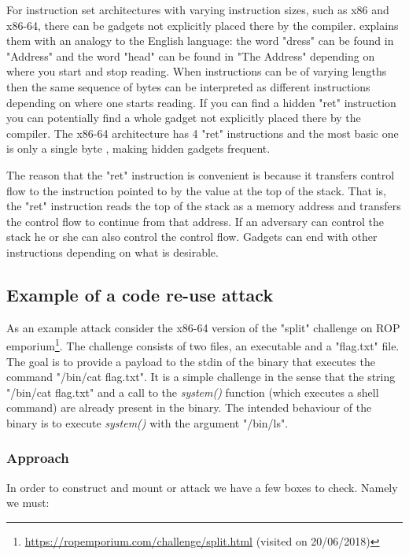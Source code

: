 For instruction set architectures with varying instruction sizes, such as x86 and x86-64,
there can be gadgets not explicitly placed there by the compiler. \textcite{rop} explains
them with an analogy to the English language: the word "dress" can be found in
"Address" and the word "head" can be found in "The Address" depending on where you start
and stop reading. When instructions can be of varying lengths then the same sequence of
bytes can be interpreted as different instructions depending on where one starts reading.
If you can find a hidden "ret" instruction you can potentially find a whole gadget not
explicitly placed there by the compiler. The x86-64 architecture has 4 "ret" instructions
and the most basic one is only a single byte \cite{x86-ret}, making hidden gadgets frequent.

The reason that the "ret" instruction is convenient is because it transfers control flow
to the instruction pointed to by the value at the top of the stack. That is, the "ret"
instruction reads the top of the stack as a memory address and transfers the control flow
to continue from that address. If an adversary can control the stack he or she can also
control the control flow. Gadgets can end with other instructions depending on what is
desirable.

\subsection{Example of a code re-use attack}

As an example attack consider the x86-64 version of the "split" challenge on ROP emporium\footnote{\url{https://ropemporium.com/challenge/split.html} (visited on 20/06/2018)}.
The challenge consists of two files, an executable and a "flag.txt" file. The goal is to
provide a payload to the stdin of the binary that executes the command "/bin/cat flag.txt".
It is a simple challenge in the sense that the string "/bin/cat flag.txt" and a call to
the \textit{system()} function (which executes a shell command) are already present in the
binary. The intended behaviour of the binary is to execute \textit{system()} with the
argument "/bin/ls".

\subsubsection{Approach}

In order to construct and mount or attack we have a few boxes to check. Namely we must:

